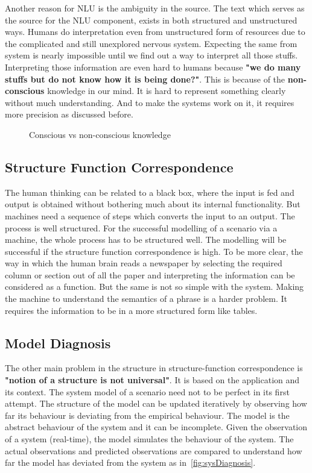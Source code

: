 \documentclass{bmcart}
\begin{document}
Another reason for NLU is the ambiguity in the source. The text which serves as the source for the NLU component, exists in both structured and unstructured ways. Humans 
do interpretation even from unstructured form of resources due to the complicated 
and still unexplored nervous system. Expecting the same from system is nearly impossible until we find out a way to interpret all those stuffs. Interpreting those information are even hard to humans because {\bf "we do many stuffs but do not know how it is being done?"}. This is because of the {\bf non-conscious} knowledge in our mind. It is hard to represent something clearly without much understanding. And to make the systems work on it, it requires more precision as discussed before. 

\begin{figure}
		\centering
		\vspace{0.5cm}
		\caption{Conscious vs non-conscious knowledge}
		\label{fig:nlg}
\end{figure}


\subsection{Structure Function Correspondence}
\label{ssec:sfcorrespondence}

The human thinking can be related to a black box, where the input is fed and output is obtained without bothering much about its internal functionality. But machines need a sequence of steps which converts the input to an output. The process is well structured.
For the successful modelling of a scenario via a machine, the whole process has to be
structured well. The modelling will be successful if the structure function correspondence is high. To be more clear, the way in which the human brain reads a newspaper by selecting the required column or section out of all the paper and interpreting the information can be considered as a function. But the same is not so simple with the system. Making the machine to understand the semantics of a phrase is a harder problem. It requires the information to be in a more structured form like tables.

\subsection{Model Diagnosis}
\label{ssec:modeldiagnosis}
The other main problem in the structure in structure-function correspondence is {\bf "notion of a structure is not universal"}. It is based on the application and its context. The system model of a scenario need not to be perfect in its first attempt. The structure of the model can be updated iteratively by observing how far its behaviour is deviating from the empirical behaviour. The model is the abstract behaviour of the system and it can be incomplete. Given the observation of a system (real-time), the model simulates the behaviour of the system. The actual observations and predicted observations are compared to understand how far the model has deviated from the system as in~\ref{fig:sysDiagnosis}. 
\end{document}
